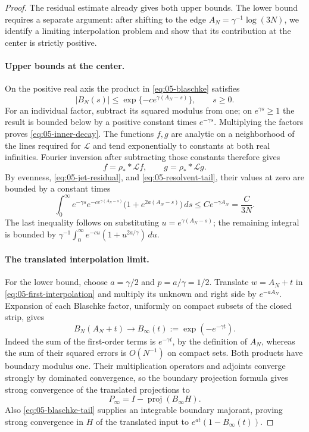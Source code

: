 \begin{proof}
The residual estimate already gives both upper bounds. The lower bound
requires a separate argument: after shifting to the edge
\(A_N=\gamma^{-1}\log(3N)\), we identify a limiting interpolation
problem and show that its contribution at the center is strictly positive.

\paragraph{Upper bounds at the center.}
On the positive real axis the product in \eqref{eq:05-blaschke} satisfies
\begin{equation}
 |B_N(s)|\le\exp\{-c e^{\gamma(A_N-s)}\},\qquad s\ge0.
 \label{eq:05-inner-decay}
\end{equation}
For an individual factor, subtract its squared modulus from one; on \(e^{\gamma s}\ge1\) the result is bounded below by a positive constant times \(e^{-\gamma s}\). Multiplying the factors proves \eqref{eq:05-inner-decay}. The functions \(f,g\) are analytic on a neighborhood of the lines required for \(\mathscr L\) and tend exponentially to constants at both real infinities. Fourier inversion after subtracting those constants therefore gives
\[
 f=\rho_* *\mathscr Lf,
 \qquad g=\rho_* *\mathscr Lg.
\]
By evenness, \eqref{eq:05-jet-residual}, and \eqref{eq:05-resolvent-tail}, their values at zero are bounded by a constant times
\[
 \int_0^\infty e^{-\gamma s}
       e^{-c e^{\gamma(A_N-s)}}
       \bigl(1+e^{2a(A_N-s)}\bigr)\,ds
 \le C e^{-\gamma A_N}=\frac{C}{3N}.
\]
The last inequality follows on substituting \(u=e^{\gamma(A_N-s)}\); the remaining integral is bounded by
\(\gamma^{-1}\int_0^\infty e^{-cu}(1+u^{2a/\gamma})\,du\).

\paragraph{The translated interpolation limit.}
For the lower bound, choose
\(a=\gamma/2\) and \(p=a/\gamma=1/2\).
Translate \(w=A_N+t\) in \eqref{eq:05-first-interpolation} and multiply its unknown and right side by \(e^{-aA_N}\). Expansion of each Blaschke factor, uniformly on compact subsets of the closed strip, gives
\begin{equation}
 B_N(A_N+t)\longrightarrow
 B_\infty(t):=\exp(-e^{-\gamma t}).
 \label{eq:05-inner-limit}
\end{equation}
Indeed the sum of the first-order terms is \(e^{-\gamma t}\), by the definition of \(A_N\), whereas the sum of their squared errors is \(O(N^{-1})\) on compact sets. Both products have boundary modulus one. Their multiplication operators and adjoints converge strongly by dominated convergence, so the boundary projection formula gives strong convergence of the translated projections to
\[
 P_\infty=I-\operatorname{proj}(B_\infty H).
\]
Also \eqref{eq:05-blaschke-tail} supplies an integrable boundary majorant, proving strong convergence in \(H\) of the translated input to \(e^{at}(1-B_\infty(t))\).


\end{proof}
